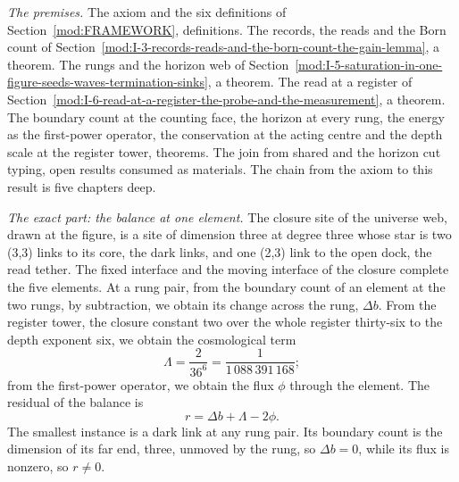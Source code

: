 \begin{chproof}
\textit{The premises.} The axiom and the six definitions of Section~\ref{mod:FRAMEWORK}, definitions. The records, the reads and the Born count of Section~\ref{mod:I-3-records-reads-and-the-born-count-the-gain-lemma}, a theorem. The rungs and the horizon web of Section~\ref{mod:I-5-saturation-in-one-figure-seeds-waves-termination-sinks}, a theorem. The read at a register of Section~\ref{mod:I-6-read-at-a-register-the-probe-and-the-measurement}, a theorem. The boundary count at the counting face, the horizon at every rung, the energy as the first-power operator, the conservation at the acting centre and the depth scale at the register tower, theorems. The join from shared and the horizon cut typing, open results consumed as materials. The chain from the axiom to this result is five chapters deep.

\textit{The exact part: the balance at one element.} The closure site of the universe web, drawn at the figure, is a site of dimension three at degree three whose star is two (3,3) links to its core, the dark links, and one (2,3) link to the open dock, the read tether. The fixed interface and the moving interface of the closure complete the five elements. At a rung pair, from the boundary count of an element at the two rungs, by subtraction, we obtain its change across the rung, $\Delta b$. From the register tower, the closure constant two over the whole register thirty-six to the depth exponent six, we obtain the cosmological term
\begin{equation}
\Lambda=\frac{2}{36^{6}}=\frac{1}{1\,088\,391\,168} ;
\end{equation}
from the first-power operator, we obtain the flux $\phi$ through the element. The residual of the balance is
\begin{equation}
r=\Delta b+\Lambda-2\phi .
\end{equation}
The smallest instance is a dark link at any rung pair. Its boundary count is the dimension of its far end, three, unmoved by the rung, so $\Delta b=0$, while its flux is nonzero, so $r\neq 0$.


\end{chproof}
